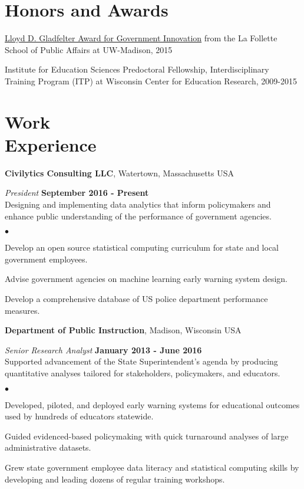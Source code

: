 \documentclass[margin,line]{res}
\newenvironment{list2}{
  \begin{list}{$\bullet$}{%
      \setlength{\itemsep}{0in}
      \setlength{\parsep}{0in} \setlength{\parskip}{0in}
      \setlength{\topsep}{0in} \setlength{\partopsep}{0in} 
      \setlength{\leftmargin}{0.2in}}}{\end{list}}
\begin{document}
\begin{resume}
\section{\sc Honors and Awards} 

\href{https://www.lafollette.wisc.edu/news/2015-gladfelter-winners-announced}{Lloyd D. Gladfelter Award for Government Innovation} from the La Follette School of Public Affairs at UW-Madison, 2015

\vspace*{-2.5mm}

Institute for Education Sciences Predoctoral Fellowship, Interdisciplinary Training Program (ITP) at Wisconsin Center for Education Research, 2009-2015

\section{\sc Work \\ Experience}
{\bf Civilytics Consulting LLC}, Watertown, Massachusetts USA

\vspace{-.3cm}
{\em President} \hfill {\bf September 2016 - Present}\\
Designing and implementing data analytics that inform policymakers and enhance 
public understanding of the performance of government agencies.\\
\vspace{-2mm}
\begin{list2}
\item Develop an open source statistical computing curriculum for state and 
local government employees.
\item Advise government agencies on machine learning early warning system design. 
\item Develop a comprehensive database of US police department performance measures.
\end{list2}
\vspace{-.1cm}

{\bf Department of Public Instruction}, Madison, Wisconsin USA

\vspace{-.3cm}
{\em Senior Research Analyst} \hfill {\bf January 2013 - June 2016}\\
Supported advancement of the State Superintendent's agenda by producing quantitative 
analyses tailored for stakeholders, policymakers, and educators. \\
\vspace{-2mm}
\begin{list2}
\item Developed, piloted, and deployed early warning systems for educational outcomes 
used by hundreds of educators statewide. 
\item Guided evidenced-based policymaking with quick turnaround analyses of large administrative datasets. 
\item Grew state government employee data literacy and statistical computing skills by developing and 
leading dozens of regular training workshops.
\end{list2}


\end{resume}
\end{document}
